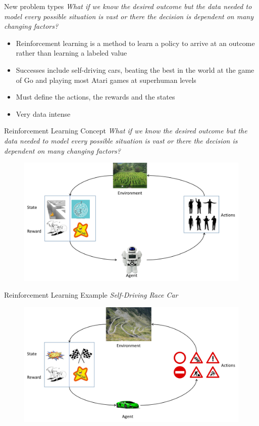 \documentclass[10pt]{beamer}
\begin{document}
\begin{frame}{New problem types}
\emph{What if we know the desired outcome but the data needed to model every possible situation is vast or there the decision is dependent on many changing factors?}
	\begin{itemize}
		\item Reinforcement learning is a method to learn a policy to arrive at an outcome rather than learning a labeled value
		\item Successes include self-driving cars, beating the best in the world at the game of Go and playing most Atari games at superhuman levels 
		\item Must define the actions, the rewards and the states
		\item Very data intense
	\end{itemize}
\end{frame}

\begin{frame}{Reinforcement Learning Concept}
\emph{What if we know the desired outcome but the data needed to model every possible situation is vast or there the decision is dependent on many changing factors?}
		\begin{figure}
			\includegraphics[width=1.00\textwidth, center, trim=0cm 0cm 0 0cm]{images/RL_concept.png}
	\end{figure}
\end{frame}

\begin{frame}{Reinforcement Learning Example}
\emph{Self-Driving Race Car}
		\begin{figure}
			\includegraphics[width=1.00\textwidth, center, trim=0cm 0cm 0 0cm]{images/RL_example.png}
	\end{figure}
\end{frame}
\end{document}
